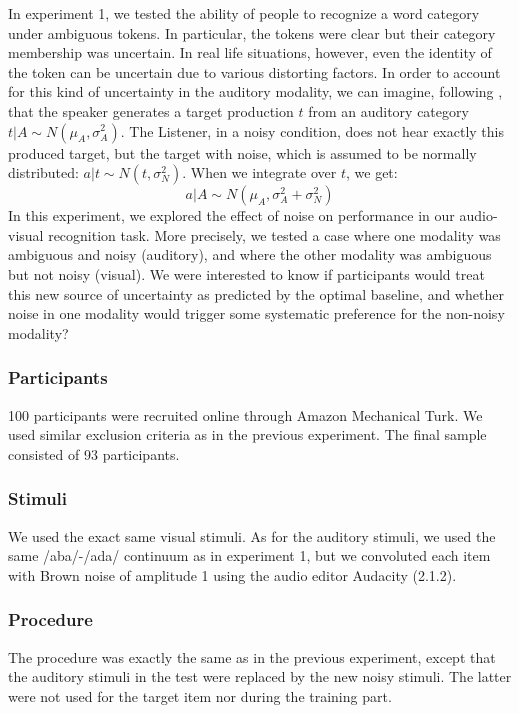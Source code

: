 \documentclass[10pt,letterpaper]{article}
\begin{document}
In experiment 1, we tested the ability of people to recognize a word category under ambiguous tokens. In particular, the tokens were clear but their category membership was uncertain. In real life situations, however, even the identity of the token can be uncertain due to various distorting factors. In order to account for this kind of uncertainty in the auditory modality, we can imagine, following , that the speaker generates a target production $t$ from an auditory category
$t | A \sim N(\mu_{A}, \sigma^2_{A})$. The Listener, in a noisy condition, does not hear exactly this produced target, but the target with noise, which is assumed to be normally distributed: $a | t \sim N(t, \sigma^2_{N})$. When we integrate over $t$, we get:
\begin{equation}
a | A \sim N(\mu_{A}, \sigma^2_{A}+\sigma^2_{N})
\end{equation}
In this experiment, we explored the effect of noise on performance in our audio-visual recognition task. More precisely, we tested a case where one modality was ambiguous and noisy (auditory), and where the other modality was ambiguous but not noisy (visual). We were interested to know if participants would treat this new source of uncertainty as predicted by the optimal baseline, and whether noise in one modality would trigger some systematic preference for the non-noisy modality?   
\subsubsection{Participants}

100 participants were recruited online through Amazon Mechanical Turk. We used similar exclusion criteria as in the previous experiment. The final sample consisted of 93 participants.

\subsubsection{Stimuli}
We used the exact same visual stimuli. As for the auditory stimuli, we used the same /aba/-/ada/ continuum as in experiment 1, but we convoluted each item with Brown noise of amplitude 1 using the audio editor Audacity (2.1.2). 

\subsubsection{Procedure}
The procedure was exactly the same as in the previous experiment, except that the auditory stimuli in the test were replaced by the new noisy stimuli. The latter were not used for the target item nor during the training part. 
\end{document}
